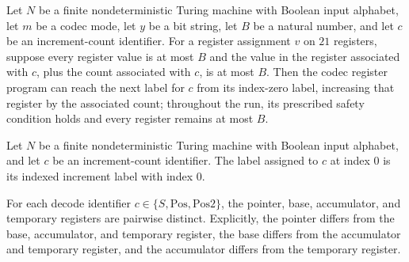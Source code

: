 \begin{theorem}
\label{Complexity.Codec.ic_run}
\leanok
{}
Let $N$ be a finite nondeterministic Turing machine with Boolean input alphabet, let $m$
be a codec mode, let $y$ be a bit string, let $B$ be a natural number, and let $c$ be an
increment-count identifier. For a register assignment $v$ on $21$ registers, suppose
every register value is at most $B$ and the value in the register associated with $c$,
plus the count associated with $c$, is at most $B$. Then the codec register program can
reach the next label for $c$ from its index-zero label, increasing that register by the
associated count; throughout the run, its prescribed safety condition holds and every
register remains at most $B$.
\end{theorem}

\begin{lemma}
\label{Complexity.Codec.icL_zero}
\leanok
{}
Let $N$ be a finite nondeterministic Turing machine with Boolean input alphabet, and let
$c$ be an increment-count identifier. The label assigned to $c$ at index $0$ is its
indexed increment label with index $0$.
\end{lemma}

\begin{lemma}
\label{Complexity.Codec.dc_distinct}
\leanok
{}
For each decode identifier $c\in\{S,\mathrm{Pos},\mathrm{Pos2}\}$, the pointer, base,
accumulator, and temporary registers are pairwise distinct. Explicitly, the pointer
differs from the base, accumulator, and temporary register, the base differs from the
accumulator and temporary register, and the accumulator differs from the temporary
register.
\end{lemma}

